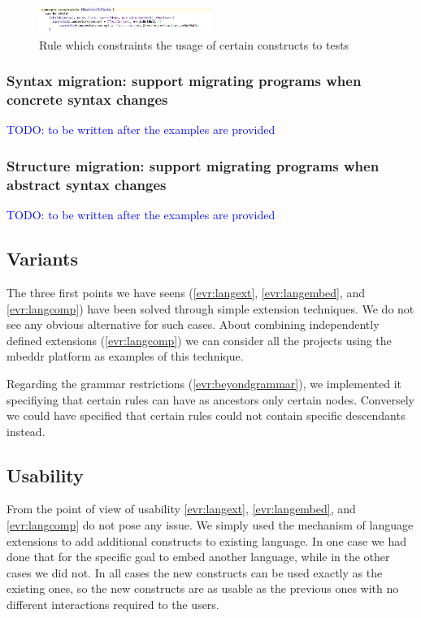 \documentclass[preprint,numbers,10pt]{sigplanconf}
\newcommand\comment[1]{\textcolor{blue}{#1}}
\begin{document}
\begin{figure}[H]
	\centering
	\includegraphics[width=0.50\textwidth]{screens/restricted_to_test.png}
	\caption{Rule which constraints the usage of certain constructs to tests}
	\label{fig:restrictedtotest}
\end{figure}

\subsubsection{Syntax migration: support migrating programs when concrete syntax changes}
\label{evr:synmigr}

\comment{TODO: to be written after the examples are provided}

\subsubsection{Structure migration: support migrating programs when abstract syntax changes}
\label{evr:structmigr}

\comment{TODO: to be written after the examples are provided}

\subsection{Variants}

The three first points we have seens (\ref{evr:langext}, \ref{evr:langembed}, and \ref{evr:langcomp}) have been solved through simple extension techniques. We do not see any obvious alternative for such cases. About combining independently defined extensions (\ref{evr:langcomp}) we can consider all the projects using the mbeddr platform as examples of this technique.

Regarding the grammar restrictions (\ref{evr:beyondgrammar}), we implemented it specifiying that certain rules can have as ancestors only certain nodes. Conversely we could have specified that certain rules could not contain specific descendants instead.

\subsection{Usability}

From the point of view of usability \ref{evr:langext}, \ref{evr:langembed}, and \ref{evr:langcomp} do not pose any issue. We simply used the mechanism of language extensions to add additional constructs to existing language. In one case we had done that for the specific goal to embed another language, while in the other cases we did not. In all cases the new constructs can be used exactly as the existing ones, so the new constructs are as usable as the previous ones with no different interactions required to the users.
\end{document}
